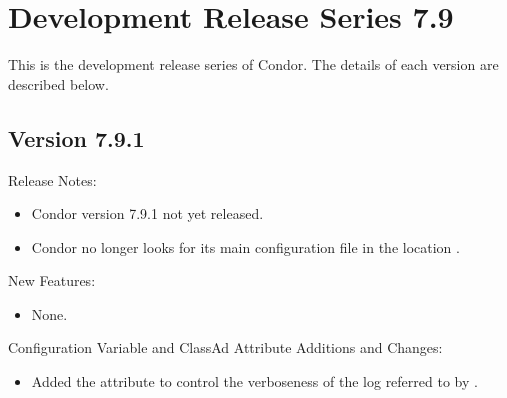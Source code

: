 
\section{\label{sec:History-7-9}Development Release Series 7.9}

This is the development release series of Condor.
The details of each version are described below.

\subsection*{\label{sec:New-7-9-1}Version 7.9.1}

\noindent Release Notes:

\begin{itemize}

\item Condor version 7.9.1 not yet released.

\item Condor no longer looks for its main configuration file in the
location .

\end{itemize}


\noindent New Features:

\begin{itemize}

\item None.

\end{itemize}

\noindent Configuration Variable and ClassAd Attribute Additions and Changes:

\begin{itemize}

\item Added the attribute  to control the verboseness of
the log referred to by .

\end{itemize}


